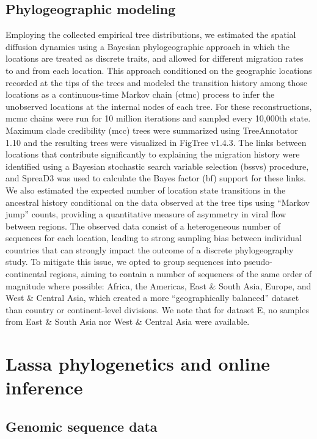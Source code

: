 \subsection{Phylogeographic modeling}

Employing the collected empirical tree distributions, we estimated the spatial diffusion dynamics using a Bayesian phylogeographic approach in which the locations are treated as discrete traits, and allowed for different migration rates to and from each location.
This approach conditioned on the geographic locations recorded at the tips of the trees and modeled the transition history among those locations as a continuous-time Markov chain (\gls{ctmc}) process to infer the unobserved locations at the internal nodes of each tree.
For these reconstructions, \gls{mcmc} chains were run for 10 million iterations and sampled every 10,000th state.
Maximum clade credibility (\gls{mcc}) trees were summarized using TreeAnnotator 1.10 \cite{suchard2018bayesian} and the resulting trees were visualized in FigTree v1.4.3.
The links between locations that contribute significantly to explaining the migration history were identified using a Bayesian stochastic search variable selection (\gls{bssvs}) procedure, and SpreaD3 \cite{bielejec2016spread3} was used to calculate the Bayes factor (\gls{bf}) support for these links.
We also estimated the expected number of location state transitions in the ancestral history conditional on the data observed at the tree tips using ``Markov jump'' counts, providing a quantitative measure of asymmetry in viral flow between regions.
The observed data consist of a heterogeneous number of sequences for each location, leading to strong sampling bias between individual countries that can strongly impact the outcome of a discrete phylogeography study.
To mitigate this issue, we opted to group sequences into pseudo-continental regions, aiming to contain a number of sequences of the same order of magnitude where possible: Africa, the Americas, East \& South Asia, Europe, and West \& Central Asia, which created a more ``geographically balanced'' dataset than country or continent-level divisions.
We note that for dataset E, no samples from East \& South Asia nor West \& Central Asia were available.

\section{Lassa phylogenetics and online inference}

\subsection{Genomic sequence data}

